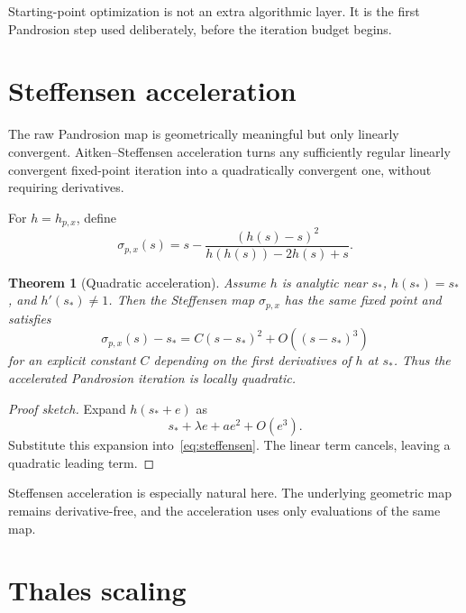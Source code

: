 \documentclass[11pt,a4paper]{article}
\theoremstyle{plain}
\newtheorem{theorem}{Theorem}[section]
\theoremstyle{definition}
\theoremstyle{remark}
\newcommand{\hp}{h_{p,x}}
\newcommand{\stef}{\sigma_{p,x}}
\newenvironment{takeaway}{%
  \begin{center}\begin{minipage}{0.92\linewidth}\small\itshape\color{blue!45!black}%
}{%
  \end{minipage}\end{center}%
}
\begin{document}
\begin{takeaway}
Starting-point optimization is not an extra algorithmic layer.  It is the first
Pandrosion step used deliberately, before the iteration budget begins.
\end{takeaway}

\section{Steffensen acceleration}
\label{sec:steffensen}

The raw Pandrosion map is geometrically meaningful but only linearly
convergent.  Aitken--Steffensen acceleration turns any sufficiently regular
linearly convergent fixed-point iteration into a quadratically convergent one,
without requiring derivatives.

For $h=\hp$, define
\begin{equation}
  \stef(s)
  =s-\frac{(h(s)-s)^2}{h(h(s))-2h(s)+s}.
  \label{eq:steffensen}
\end{equation}

\begin{theorem}[Quadratic acceleration]
Assume $h$ is analytic near $s_*$, $h(s_*)=s_*$, and $h'(s_*)\ne 1$.  Then the
Steffensen map $\stef$ has the same fixed point and satisfies
\[
  \stef(s)-s_*=C(s-s_*)^2+O((s-s_*)^3)
\]
for an explicit constant $C$ depending on the first derivatives of $h$ at
$s_*$.  Thus the accelerated Pandrosion iteration is locally quadratic.
\end{theorem}

\begin{proof}[Proof sketch]
Expand $h(s_*+e)$ as
\[
  s_*+\lambda e+a e^2+O(e^3).
\]
Substitute this expansion into~\eqref{eq:steffensen}.  The linear term cancels,
leaving a quadratic leading term.
\end{proof}

Steffensen acceleration is especially natural here.  The underlying geometric
map remains derivative-free, and the acceleration uses only evaluations of the
same map.

\section{Thales scaling}
\label{sec:scaling}
\end{document}
